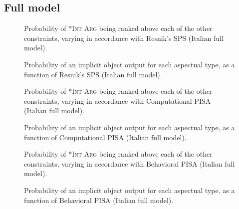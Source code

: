 \subsection{Full model} 


\begin{figure}[!htb]
\caption{Probability of \textsc{*Int Arg} being ranked above each of the other constraints, varying in accordance with Resnik's SPS (Italian full model).}
    
\end{figure}

\begin{figure}[!htb]
\caption{Probability of an implicit object output for each aspectual type, as a function of Resnik's SPS (Italian full model).}
    
\end{figure}



\begin{figure}[!htb]
\caption{Probability of \textsc{*Int Arg} being ranked above each of the other constraints, varying in accordance with Computational PISA (Italian full model).}
    
\end{figure}

\begin{figure}[!htb]
\caption{Probability of an implicit object output for each aspectual type, as a function of Computational PISA (Italian full model).}
    
\end{figure}



\begin{figure}[!htb]
\caption{Probability of \textsc{*Int Arg} being ranked above each of the other constraints, varying in accordance with Behavioral PISA (Italian full model).}
    
\end{figure}

\begin{figure}[!htb]
\caption{Probability of an implicit object output for each aspectual type, as a function of Behavioral PISA (Italian full model).}
    
\end{figure}